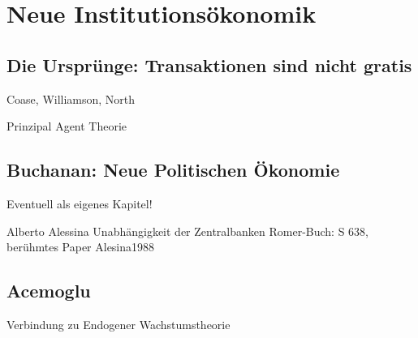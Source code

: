 %
%
%

\chapter{Neue Institutionsökonomik}
\label{Neue Institut}

\section{Die Ursprünge: Transaktionen sind nicht gratis} \label{sec: Neue Inst}
Coase, Williamson, North

Prinzipal Agent Theorie



\section{Buchanan: Neue Politischen Ökonomie}
\label{Pol_Econ}

Eventuell als eigenes Kapitel!

Alberto Alessina
Unabhängigkeit der Zentralbanken Romer-Buch: S 638, berühmtes Paper Alesina1988

\section{Acemoglu}
Verbindung zu Endogener Wachstumstheorie

